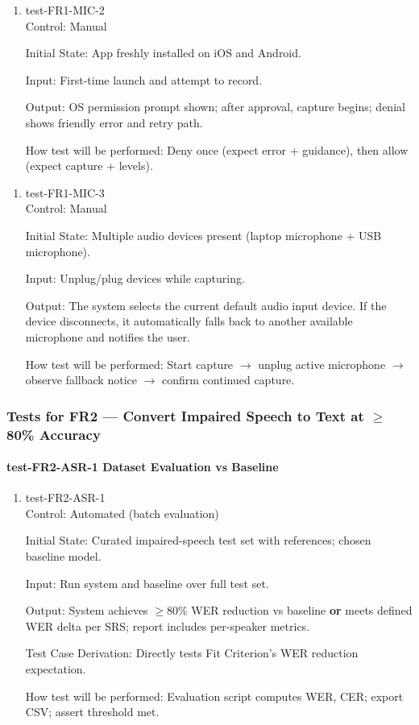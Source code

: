 \documentclass[12pt, titlepage]{article}
\begin{document}
\begin{enumerate}
\item{test-FR1-MIC-2\\}
Control: Manual

Initial State: App freshly installed on iOS and Android.

Input: First-time launch and attempt to record.

Output: OS permission prompt shown; after approval, capture begins; denial shows friendly error and retry path.

How test will be performed: Deny once (expect error + guidance), then allow (expect capture + levels).
\end{enumerate}

\begin{enumerate}
\item{test-FR1-MIC-3\\}
Control: Manual

Initial State: Multiple audio devices present (laptop microphone + USB microphone).

Input: Unplug/plug devices while capturing.

Output: The system selects the current default audio input device. If the device disconnects, it automatically falls back to another available microphone and notifies the user.

How test will be performed: Start capture $\rightarrow$ unplug active microphone $\rightarrow$ observe fallback notice $\rightarrow$ confirm continued capture.
\end{enumerate}

\subsubsection{Tests for FR2 — Convert Impaired Speech to Text at $\geq$80\% Accuracy}

\paragraph{test-FR2-ASR-1 Dataset Evaluation vs Baseline}

\begin{enumerate}
\item{test-FR2-ASR-1\\}
Control: Automated (batch evaluation)

Initial State: Curated impaired-speech test set with references; chosen baseline model.

Input: Run system and baseline over full test set.

Output: System achieves $\geq$80\% WER reduction vs baseline \textbf{or} meets defined WER delta per SRS; report includes per-speaker metrics.

Test Case Derivation: Directly tests Fit Criterion’s WER reduction expectation.

How test will be performed: Evaluation script computes WER, CER; export CSV; assert threshold met.
\end{enumerate}
\end{document}

